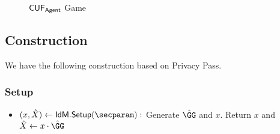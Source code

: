 \begin{itemize}
\begin{definition}
\begin{figure*}
\begin{pchstack}[center, space=0.2cm, boxed]
\begin{pcvstack}
    \end{pcvstack}
    \begin{pcvstack}
    \end{pcvstack}
    \end{pchstack}
\caption{$\mathsf{CUF}_{\textsf{Agent}}$ Game}
\label{game:cuf_simple_agent}
\end{figure*}
\end{definition}

\end{itemize}

\subsection{Construction}
We have the following construction based on Privacy Pass.

\subsubsection{Setup}
\begin{itemize}
    \item $(x, \hat{X}) \gets \idm.\mathsf{Setup}(\secparam):$ Generate $\GGhat$ and $x$. Return $x$ and $\hat{X} \gets x\cdot \GGhat$
\end{itemize}

